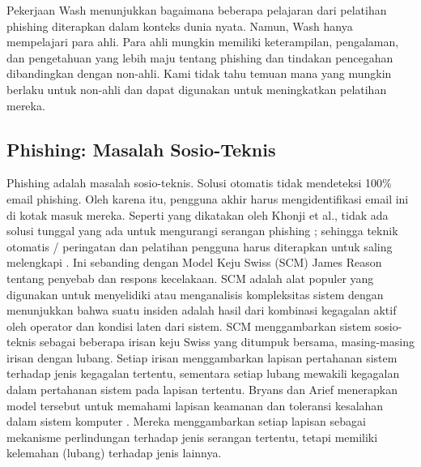 \documentclass[lettersize,journal]{IEEEtran}
\begin{document}
Pekerjaan Wash \cite{tigaempat} menunjukkan bagaimana beberapa pelajaran dari
pelatihan phishing diterapkan dalam konteks dunia nyata. Namun, Wash hanya
mempelajari para ahli. Para ahli mungkin memiliki keterampilan, pengalaman, dan
pengetahuan yang lebih maju tentang phishing dan tindakan pencegahan
dibandingkan dengan non-ahli. Kami tidak tahu temuan mana yang mungkin berlaku
untuk non-ahli dan dapat digunakan untuk meningkatkan pelatihan mereka.

\subsection{Phishing: Masalah Sosio-Teknis}

Phishing adalah masalah sosio-teknis. Solusi otomatis tidak mendeteksi 100\%
email phishing. Oleh karena itu, pengguna akhir harus mengidentifikasi email
ini di kotak masuk mereka. Seperti yang dikatakan oleh Khonji et al., tidak ada
solusi tunggal yang ada untuk mengurangi serangan phishing \cite{satutujuh};
sehingga teknik otomatis / peringatan dan pelatihan pengguna harus diterapkan
untuk saling melengkapi \cite{satusembilan}. Ini sebanding dengan Model Keju
Swiss (SCM) James Reason \cite{duadelapan} tentang penyebab dan respons
kecelakaan. SCM adalah alat populer yang digunakan untuk menyelidiki atau
menganalisis kompleksitas sistem dengan menunjukkan bahwa suatu insiden adalah
hasil dari kombinasi kegagalan aktif oleh operator dan kondisi laten dari
sistem. SCM menggambarkan sistem sosio-teknis sebagai beberapa irisan keju
Swiss yang ditumpuk bersama, masing-masing irisan dengan lubang. Setiap irisan
menggambarkan lapisan pertahanan sistem terhadap jenis kegagalan tertentu,
sementara setiap lubang mewakili kegagalan dalam pertahanan sistem pada lapisan
tertentu. Bryans dan Arief menerapkan model tersebut untuk memahami lapisan
keamanan dan toleransi kesalahan dalam sistem komputer \cite{satu}. Mereka
menggambarkan setiap lapisan sebagai mekanisme perlindungan terhadap jenis
serangan tertentu, tetapi memiliki kelemahan (lubang) terhadap jenis lainnya.
\end{document}
